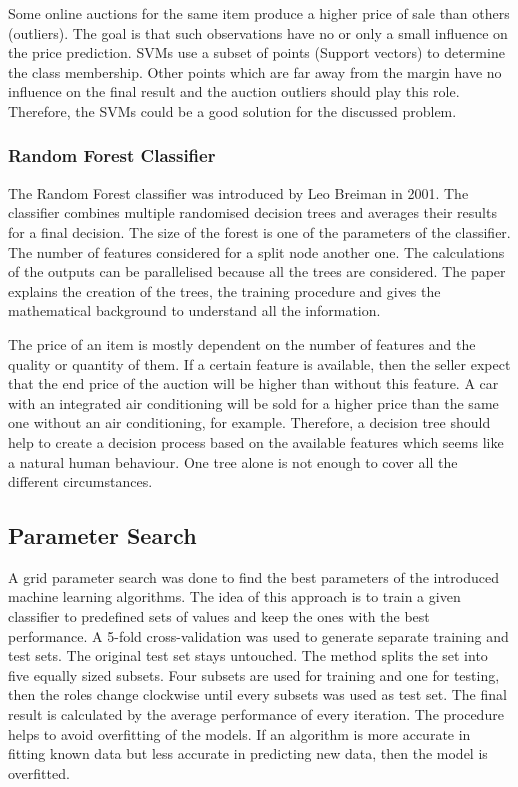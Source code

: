 Some online auctions for the same item produce a higher price of sale than others (outliers). The goal is that such observations have no or only a small influence on the price prediction. SVMs use a subset of points (Support vectors) to determine the class membership. Other points which are far away from the margin have no influence on the final result and the auction outliers should play this role. Therefore, the SVMs could be a good solution for the discussed problem. 
\subsubsection{Random Forest Classifier}
The Random Forest classifier was introduced by Leo Breiman in 2001\cite{breiman}. The classifier combines multiple randomised decision trees and averages their results for a final decision. The size of the forest is one of the parameters of the classifier. The number of features considered for a split node another one. The calculations of the outputs can be parallelised because all the trees are considered. The paper explains the creation of the trees, the training procedure and gives the mathematical background to understand all the information.

The price of an item is mostly dependent on the number of features and the quality or quantity of them. If a certain feature is available, then the seller expect that the end price of the auction will be higher than without this feature. A car with an integrated air conditioning will be sold for a higher price than the same one without an air conditioning, for example. Therefore, a decision tree should help to create a decision process based on the available features which seems like a natural human behaviour. One tree alone is not enough to cover all the different circumstances. 
\subsection{Parameter Search}
A grid parameter search was done to find the best parameters of the introduced machine learning algorithms. The idea of this approach is to train a given classifier to predefined sets of values and keep the ones with the best performance. A 5-fold cross-validation was used to generate separate training and test sets. The original test set stays untouched. The method splits the set into five equally sized subsets. Four subsets are used for training and one for testing, then the roles change clockwise until every subsets was used as test set. The final result is calculated by the average performance of every iteration. The procedure helps to avoid overfitting of the models. If an algorithm is more accurate in fitting known data but less accurate in predicting new data, then the model is overfitted.
